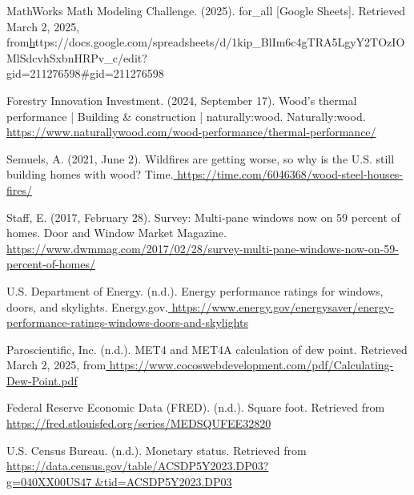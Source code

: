 \documentclass{article}
\begin{document}
\begin{thebibliography}{9}




 MathWorks Math Modeling Challenge. (2025). for\_all [Google Sheets]. Retrieved March 2, 2025, from\href{https://docs.google.com/spreadsheets/d/1kip_BlIm6c4gTRA5LgyY2TOzIOMlSdcvhSxbnHRPv_c/edit?gid=211276598\#gid=211276598} https://docs.google.com/spreadsheets/d/1kip\_BlIm6c4gTRA5LgyY2TOzIOMlSdcvhSxbnHRPv\_c/edit?\\
gid=211276598\#gid=211276598

 Forestry Innovation Investment. (2024, September 17). Wood’s thermal performance | Building \& construction | naturally:wood. Naturally:wood.\href{https://www.naturallywood.com/wood-performance/thermal-performance/}{ https://www.naturallywood.com/wood-performance/thermal-performance/}

 Semuels, A. (2021, June 2). Wildfires are getting worse, so why is the U.S. still building homes with wood? Time.\href{https://time.com/6046368/wood-steel-houses-fires/}{ https://time.com/6046368/wood-steel-houses-fires/ }

 Staff, E. (2017, February 28). Survey: Multi-pane windows now on 59 percent of homes. Door and Window Market Magazine.\href{https://www.dwmmag.com/2017/02/28/survey-multi-pane-windows-now-on-59-percent-of-homes/}{ https://www.dwmmag.com/2017/02/28/survey-multi-pane-windows-now-on-59-percent-of-homes/ }

 U.S. Department of Energy. (n.d.). Energy performance ratings for windows, doors, and skylights. Energy.gov.\href{https://www.energy.gov/energysaver/energy-performance-ratings-windows-doors-and-skylights}{ https://www.energy.gov/energysaver/energy-performance-ratings-windows-doors-and-skylights }

 Paroscientific, Inc. (n.d.). MET4 and MET4A calculation of dew point. Retrieved March 2, 2025, from\href{https://www.cocoswebdevelopment.com/pdf/Calculating-Dew-Point.pdf}{ https://www.cocoswebdevelopment.com/pdf/Calculating-Dew-Point.pdf }

 Federal Reserve Economic Data (FRED). (n.d.). Square foot. Retrieved from\href{https://fred.stlouisfed.org/series/MEDSQUFEE32820}{ https://fred.stlouisfed.org/series/MEDSQUFEE32820 }

 U.S. Census Bureau. (n.d.). Monetary status. Retrieved from\href{https://data.census.gov/table/ACSDP5Y2023.DP03?g=040XX00US47&tid=ACSDP5Y2023.DP03}{ https://data.census.gov/table/ACSDP5Y2023.DP03?\\
g=040XX00US47
\&tid=ACSDP5Y2023.DP03 }


\end{thebibliography}
\end{document}
